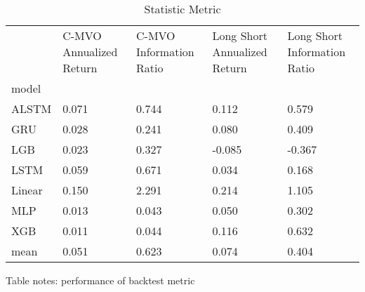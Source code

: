 \documentclass[10pt,letterpaper]{article}
\begin{document}
\begin{table}[!ht]
\begin{adjustwidth}{-2.25in}{0in} %
\centering
\caption{Statistic Metric}
\begin{tabular}{lp{1.5cm}p{1.5cm}p{1.5cm}p{1.5cm}}
\toprule
{} &  C-MVO Annualized Return &  C-MVO Information Ratio &  Long Short Annualized Return &  Long Short Information Ratio \\
model  &                          &                          &                               &                               \\
\midrule
ALSTM  &                    0.071 &                    0.744 &                         0.112 &                         0.579 \\
GRU    &                    0.028 &                    0.241 &                         0.080 &                         0.409 \\
LGB    &                    0.023 &                    0.327 &                        -0.085 &                        -0.367 \\
LSTM   &                    0.059 &                    0.671 &                         0.034 &                         0.168 \\
Linear &                    0.150 &                    2.291 &                         0.214 &                         1.105 \\
MLP    &                    0.013 &                    0.043 &                         0.050 &                         0.302 \\
XGB    &                    0.011 &                    0.044 &                         0.116 &                         0.632 \\
mean   &                    0.051 &                    0.623 &                         0.074 &                         0.404 \\
\bottomrule
\end{tabular}





\begin{flushleft}
Table notes: performance of backtest metric
\end{flushleft}
\label{table1}
\end{adjustwidth}

\end{table}
\end{document}
